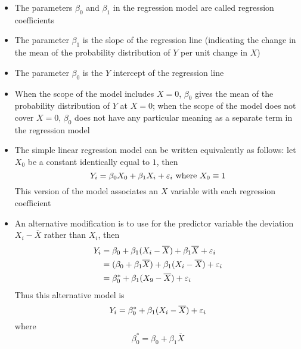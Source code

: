 \begin{itemize}
\begin{enumerate}
\end{enumerate}
\item The parameters $\beta_0$ and $\beta_1$ in the regression model are called regression coefficients
\item The parameter $\beta_1$ is the slope of the regression line (indicating the change in the mean of the probability distribution of $Y$ per unit change in $X$)
\item The parameter $\beta_0$ is the $Y$ intercept of the regression line 
\item When the scope of the model includes $X=0$, $\beta_0$ gives the mean of the probability distribution of $Y$ at $X=0$; when the scope of the model does not cover $X=0$, $\beta_0$ does not have any particular meaning as a separate term in the regression model
\item The simple linear regression model can be written equivalently as follows: let $X_0$ be a constant identically equal to $1$, then $$ Y_i = \beta_0X_0 + \beta_1X_i + \varepsilon_i \text{ where } X_0 \equiv 1 $$ This version of the model associates an $X$ variable with each regression coefficient 
\item An alternative modification is to use for the predictor variable the deviation $X_i - \overline{X}$ rather than $X_i$, then 
$$ \begin{aligned} Y_i &= \beta_0 + \beta_1(X_i - \overline{X}) + \beta_1\overline{X} + \varepsilon_i \\ 
&= (\beta_0 + \beta_1\overline{X}) + \beta_1(X_i - \overline{X}) + \varepsilon_i \\ 
&= \beta_0^* + \beta_1(X_9 - \overline{X}) + \varepsilon_i \end{aligned} $$ 
Thus this alternative model is $$ Y_i = \beta_0^* + \beta_1(X_i - \overline{X}) + \varepsilon_i $$ where $$\beta_0^* = \beta_0 + \beta_1\overline{X}$$ 
\end{itemize}

